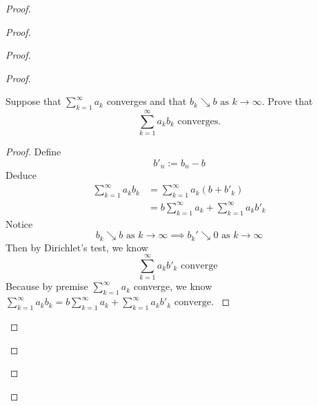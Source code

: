 \documentclass{report}
\begin{document}
\begin{proof}
\begin{proof}
\begin{proof}
\begin{proof}
\begin{question}{}{}
Suppose that $\sum_{k=1}^{\infty} a_k$ 
converges and that 
$b_k \searrow b \text{ as } k \to \infty$. Prove that 
\begin{equation}
  \sum_{k=1}^{\infty} a_k b_k \text{ converges.}
\end{equation}
\end{question}
\begin{proof}
Define
\begin{equation}
b'_n:=b_n-b
\end{equation}
Deduce
\begin{align}
  \sum_{k=1}^\infty a_kb_k&=\sum_{k=1}^\infty a_k(b+b'_k)\\
  &=b\sum_{k=1}^\infty a_k+\sum_{k=1}^\infty a_kb'_k
\end{align}
Notice
\begin{equation}
b_k\searrow b\text{ as }k\to\infty\implies b_k'\searrow 0\text{ as }k\to\infty
\end{equation}
Then by Dirichlet's test, we know
\begin{equation}
\sum_{k=1}^\infty a_kb'_k\text{ converge }
\end{equation}
Because by premise $\sum_{k=1}^\infty a_k$ converge, we know $\sum_{k=1}^\infty a_kb_k=b\sum_{k=1}^\infty a_k+\sum_{k=1}^\infty a_kb'_k\text{ converge. }$


\end{proof}


\end{proof}
\end{proof}
\end{proof}
\end{proof}
\end{document}
